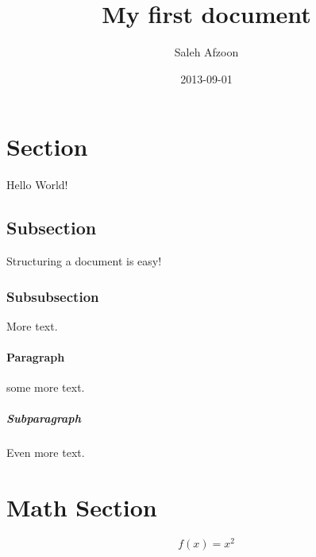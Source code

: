 \documentclass{article}
\title{My first document}
\date{2013-09-01}
\author{Saleh Afzoon}
\begin{document}
\maketitle
\newpage
  


\section{Section}
Hello World!

\subsection{Subsection}
Structuring a document is easy!

\subsubsection{Subsubsection}
More text.

\paragraph{Paragraph}
some more text.

\subparagraph{Subparagraph}
Even more text.

\section{Math Section}

\begin{equation*}
	f(x) = x^2
\end{equation*}
\end{document}
